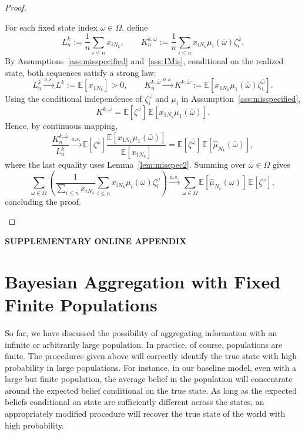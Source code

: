 \documentclass[12pt,reqno]{amsart}
\begin{document}
\begin{proof}
\begin{enumerate}
    For each fixed state index $\bar\omega\in\Omega$, define
    \[
    L_n^k:=\frac1n\sum_{i\le n}x_{iN_k},
    \qquad
    K_{n}^{k,\bar\omega}:=\frac1n\sum_{i\le n}x_{iN_k}\mu_i(\bar\omega)\zeta_i^{\bar\omega}.
    \]
    By Assumptions~\ref{ass:misspecified} and~\ref{ass:1Mis}, conditional on the realized state, both sequences satisfy a strong law:
    \[
    L_n^k \xrightarrow{a.s.} L^k:=\mathbb E[x_{1N_k}]>0,
    \qquad
    K_n^{k,\bar\omega}\xrightarrow{a.s.}K^{k,\bar\omega}:=\mathbb E[x_{1N_k}\mu_1(\bar\omega)\zeta_1^{\bar\omega}].
    \]
    Using the conditional independence of $\zeta_i^{\bar\omega}$ and $\mu_i$ in Assumption~\ref{ass:misspecified},
    \[
    K^{k,\bar\omega}
    =\mathbb E[\zeta^{\bar\omega}]\,\mathbb E[x_{1N_k}\mu_1(\bar\omega)].
    \]
    Hence, by continuous mapping,
    \[
    \frac{K_n^{k,\bar\omega}}{L_n^k}
    \xrightarrow{a.s.}
    \mathbb E[\zeta^{\bar\omega}]
    \frac{\mathbb E[x_{1N_k}\mu_1(\bar\omega)]}{\mathbb E[x_{1N_k}]}
    =
    \mathbb E[\zeta^{\bar\omega}]\,\mathbb E[\hat\mu_{N_k}(\bar\omega)],
    \]
    where the last equality uses Lemma~\ref{lem:misspec2}. Summing over $\bar\omega\in\Omega$ gives
    \[
    \sum_{\omega\in\Omega}\left(\frac{1}{\sum_{i\le n}x_{iN_k}}\sum_{i\le n}x_{iN_k}\mu_i(\omega)\zeta_i^\omega\right)
    \xrightarrow{a.s.}
    \sum_{\omega\in\Omega}\mathbb E[\hat\mu_{N_k}(\omega)]\,\mathbb E[\zeta^\omega],
    \]
    concluding the proof.
    \end{enumerate} 
    \end{proof}


\newpage

\begin{center}
\vspace*{3cm}
{\LARGE\bfseries SUPPLEMENTARY ONLINE APPENDIX}
\vspace*{2cm}
\end{center}



\section{Bayesian Aggregation with Fixed Finite Populations}\label{sec:finite}
So far, we have discussed the possibility of aggregating information with an infinite or arbitrarily large population. In practice, of course, populations are finite. The procedures given above will correctly identify the true state with high probability in large populations. For instance, in our baseline model, even with a large but finite population, the average belief in the population will concentrate around the expected belief conditional on the true state. As long as the expected beliefs conditional on state are sufficiently different across the states, an appropriately modified procedure will recover the true state of the world with high probability.
\end{document}
